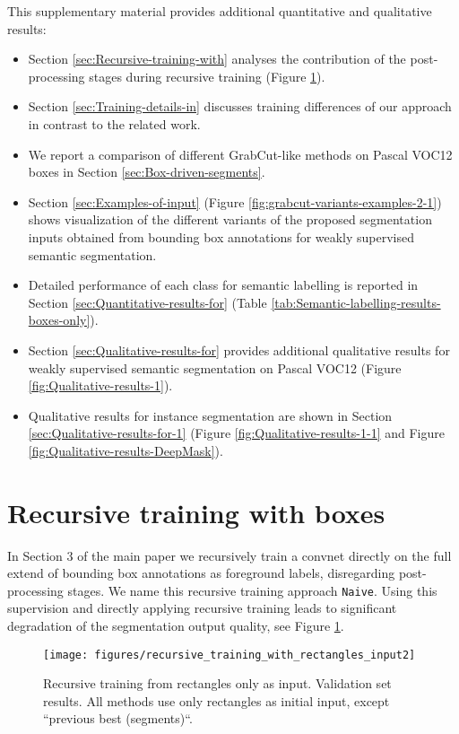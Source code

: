 \documentclass[10pt,english,british,twocolumn]{article}
\begin{document}
This supplementary material provides additional quantitative and qualitative
results:
\begin{itemize}
\item Section \ref{sec:Recursive-training-with} analyses the contribution
of the post-processing stages during recursive training (Figure \ref{fig:Training-labelling-from-rectangles}).
\item Section \ref{sec:Training-details-in} discusses training differences
of our approach in contrast to the related work.
\item We report a comparison of different GrabCut-like methods on Pascal
VOC12 boxes in Section \ref{sec:Box-driven-segments}.
\item Section \ref{sec:Examples-of-input} (Figure \ref{fig:grabcut-variants-examples-2-1})
shows visualization of the different variants of the proposed segmentation
inputs obtained from bounding box annotations for weakly supervised
semantic segmentation. 
\item Detailed performance of each class for semantic labelling is reported
in Section \ref{sec:Quantitative-results-for} (Table \ref{tab:Semantic-labelling-results-boxes-only}).
\item Section \ref{sec:Qualitative-results-for} provides additional qualitative
results for weakly supervised semantic segmentation on Pascal VOC12
(Figure \ref{fig:Qualitative-results-1}). 
\item Qualitative results for instance segmentation are shown in Section
\ref{sec:Qualitative-results-for-1} (Figure \ref{fig:Qualitative-results-1-1}
and Figure \ref{fig:Qualitative-results-DeepMask}). 
\end{itemize}

\section{\label{sec:Recursive-training-with}Recursive training with boxes}

In Section 3 of the main paper we recursively train a convnet directly
on the full extend of bounding box annotations as foreground labels,
disregarding post-processing stages. We name this recursive training
approach \texttt{Naive}. Using this supervision and directly applying
recursive training leads to significant degradation of the segmentation
output quality, see Figure \ref{fig:Training-labelling-from-rectangles}.

\begin{figure}
\begin{centering}
\texttt{[image: figures/recursive\_training\_with\_rectangles\_input2]}
\par\end{centering}
\caption{\label{fig:Training-labelling-from-rectangles}Recursive training
from rectangles only as input. Validation set results. All methods
use only rectangles as initial input, except ``previous best (segments)``. }
\end{figure}
\end{document}
